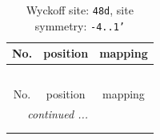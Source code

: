 \documentclass[fleqn,8pt]{jsarticle}
\begin{document}
\renewcommand{\arraystretch}{1.2}
\begin{longtable}{ccc}
\caption{Wyckoff site: {\tt 48d}, site symmetry: {\tt -4..1'}}
 \\
 \hline \hline
No. & position & mapping \\ \hline \endfirsthead

\multicolumn{2}{l}{\tablename\ \thetable{}} \\
 \hline \hline
No. & position & mapping \\ \hline \endhead

 \hline \hline
\multicolumn{2}{r}{\footnotesize\it continued ...} \\ \endfoot

 \hline \hline
\multicolumn{2}{r}{} \\ \endlastfoot


\end{longtable}
\end{document}
